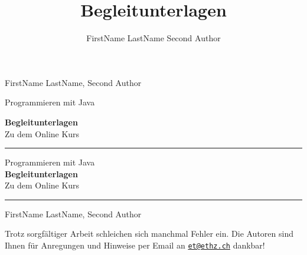 \documentclass[10pt,paper=17cm:22cm, twoside=true, DIV=14]{scrbook}
\title{Begleitunterlagen}
\author{
FirstName LastName \And Second Author
}
\begin{document}
\frontmatter
\begin{titlepage}
\begin{center}

\vspace*{3 cm} {\large \textsf{FirstName LastName, Second Author}}

\vspace{1.5 cm} {\huge \textsf{Programmieren mit Java}}

\vspace{0.5 cm} {\Huge \textbf{ \textsf{ Begleitunterlagen}}}\\
\vspace{0.5 cm} {\huge \textsf{Zu dem Online Kurs}}


\end{center}
\cleardoublepage
\par
{}%
\hfill
{}%
\par

\begin{center}
\vspace{3 cm}
\noindent\rule{\textwidth}{0.4pt}


\vspace{0.5 cm} {\huge \textsf{Programmieren mit Java}}\\
\vspace{0.5 cm} {\Huge \textbf{ \textsf{ Begleitunterlagen}}}\\
\vspace{0.5 cm} {\huge \textsf{Zu dem Online Kurs}}

\noindent\rule{\textwidth}{0.4pt}

\vspace*{1.5 cm} {\large \textsf{FirstName LastName, Second Author}}

\clearpage


\thispagestyle{impressum}
\null
\vfill



\begin{center}
Trotz sorgfältiger Arbeit schleichen sich manchmal Fehler ein. Die Autoren sind Ihnen für Anregungen und Hinweise per Email an \href{mailto:et@ethz.ch}{\nolinkurl{et@ethz.ch}} dankbar!\\


\end{center}
\end{center}
\end{titlepage}
\end{document}
